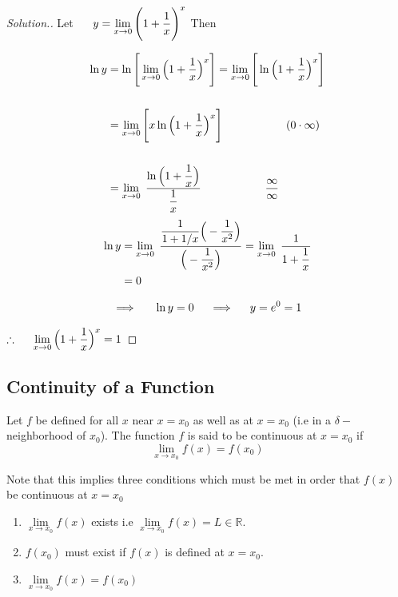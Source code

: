 \documentclass[11pt,a4paper]{article}
\theoremstyle{definition}
\newenvironment{solution}
  {\renewcommand{\qedsymbol}{}\begin{proof}[\textit{Solution}.]}
  {\end{proof}}
\begin{document}
\begin{solution}
Let $\hspace{0.5cm}y = \lim\limits_{x\rightarrow 0} \Bigg(1 + \dfrac{1}{x}\Bigg)^x$ Then

\begin{align*}
\ln y & = \ln \Bigg[\lim\limits_{x\rightarrow 0} \Big(1 + \dfrac{1}{x}\Big)^x\Bigg]
 = \lim\limits_{x\rightarrow 0}\Bigg[\ln \Big(1 + \dfrac{1}{x}\Big)^x\Bigg]\\\\
 & = \lim\limits_{x\rightarrow 0}\Bigg[ x \ln \Big(1 + \dfrac{1}{x}\Big)^x\Bigg]\hspace{2cm} (0\cdot \infty)\\\\
& = \lim\limits_{x\rightarrow 0}\hspace{0.1cm} \dfrac{\ln \Big( 1 + \dfrac{1}{x}\Big)}{\dfrac{1}{x}}\hspace{2cm} \dfrac{\infty}{\infty} 
\end{align*} 
\begin{align*} 
 \ln y & = \lim\limits_{x\rightarrow 0}\hspace{0.1cm} \dfrac{\dfrac{1}{1 + 1/x} \Big(-\dfrac{1}{x^2}\Big)}{\Big(-\dfrac{1}{x^2}\Big)}= \lim\limits_{x\rightarrow 0} \hspace{0.1cm}\dfrac{1}{1 + \dfrac{1}{x}}\\
 & = 0
\end{align*}

$$\implies\hspace{0.5cm} \ln y = 0\hspace{0.4cm} \implies \hspace{0.4cm} y = e^0 = 1$$

$\therefore\hspace{0.5cm}  \lim\limits_{x\rightarrow 0} \Big(1 + \dfrac{1}{x}\Big)^x = 1$
\end{solution}

\pagebreak
\subsection{Continuity of a Function}
Let $f$ be defined for all $x$ near $x = x_0$ as well as at $x = x_0$ (i.e in a $\delta - $ neighborhood of $x_0$). The function $f$ is said to be continuous at $x = x_0$ if $$\boxed{\lim\limits_{x \rightarrow x_0} f(x) = f(x_0)}$$

Note that this implies three conditions which must be met in order that $f(x)$ be continuous at $x = x_0$
\begin{enumerate}
\item $\lim\limits_{x \rightarrow x_0} f(x)$ exists i.e $\lim\limits_{x \rightarrow x_0} f(x) = L \in \mathbb{R}$.
\item $f(x_0)$ must exist if $f(x)$ is defined at $x = x_0$.
\item $\displaystyle{\lim\limits_{x \rightarrow x_0} f(x) = f(x_0)}$
\end{enumerate}
\end{document}
